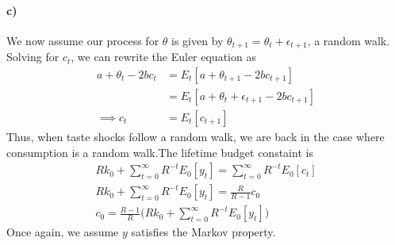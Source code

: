 \documentclass[11pt,letter]{article}
\begin{document}
\paragraph{c)} We now assume our process for $\theta$ is given by $\theta_{t+1} = \theta_t + \epsilon_{t+1}$, a random walk. Solving for $c_t$, we can rewrite the Euler equation as
\begin{equation*}
\begin{split}
	a + \theta_t - 2bc_t &= E_t\left[a + \theta_{t+1} - 2bc_{t+1}\right]\\
	&=  E_t\left[a + \theta_{t}+ \epsilon_{t+1} - 2bc_{t+1}\right]\\
	\implies c_t &=E_t\left[c_{t+1}\right]
\end{split}
\end{equation*}
Thus, when taste shocks follow a random walk,  we are back in the case where consumption is a random walk.The lifetime budget constaint is
\begin{equation*}
	\begin{split}
	Rk_0 + \sum_{t = 0}^{\infty}R^{-t}E_0\left[y_t\right] = \sum_{t = 0}^{\infty}R^{-t}E_0\left[c_t\right]\\
	Rk_0 + \sum_{t = 0}^{\infty}R^{-t}E_0\left[y_t\right] = \frac{R}{R-1}c_0\\
	c_0 = \frac{R-1}{R}\bigg(Rk_0 + \sum_{t = 0}^{\infty}R^{-t}E_0\left[y_t\right]\bigg)
	\end{split}
\end{equation*}
Once again, we assume $y$ satisfies the Markov property.
\end{document}
